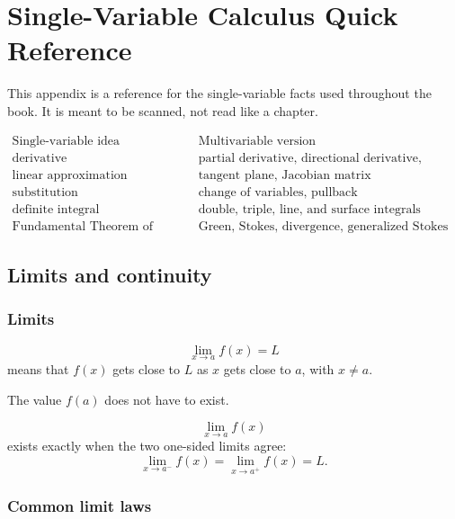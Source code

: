 
\chapter{Single-Variable Calculus Quick Reference}
\label{app:single-variable-review}

This appendix is a reference for the single-variable facts used throughout the book.
It is meant to be scanned, not read like a chapter.

\[
\begin{array}{c|c}
\text{Single-variable idea} & \text{Multivariable version} \\ \hline
\text{derivative} & \text{partial derivative, directional derivative, differential}\\[1mm]
\text{linear approximation} & \text{tangent plane, Jacobian matrix}\\[1mm]
\text{substitution} & \text{change of variables, pullback}\\[1mm]
\text{definite integral} & \text{double, triple, line, and surface integrals}\\[1mm]
\text{Fundamental Theorem of Calculus} & \text{Green, Stokes, divergence, generalized Stokes}
\end{array}
\]

\section{Limits and continuity}
\label{app:A.1}

\subsection*{Limits}

\[
\boxed{
    \lim_{x\to a}f(x)=L
}
\]
means that \(f(x)\) gets close to \(L\) as \(x\) gets close to \(a\), with \(x\ne a\).

The value \(f(a)\) does not have to exist.

\[
    \lim_{x\to a}f(x)
\]
exists exactly when the two one-sided limits agree:
\[
\boxed{
    \lim_{x\to a^-}f(x)=\lim_{x\to a^+}f(x)=L.
}
\]

\subsection*{Common limit laws}

